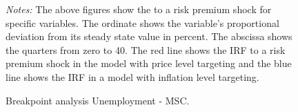 \documentclass[11pt, a4paper, leqno]{article}
\begin{document}
\begin{figure}[ht!]
	\caption{Breakpoint analysis Unemployment - MSC.}
	\label{fig:irf}
	\centering
    	\bigskip
	\begin{minipage}{\textwidth}%
		\footnotesize\setlength{\baselineskip}{11pt}%
		\bigskip \textit{Notes:} The above figures show the  to a risk premium shock for specific variables. The ordinate shows the variable's proportional deviation from its steady state value in percent. The abscissa shows the quarters from zero to 40. The red line shows the IRF to a risk premium shock in the model with price level targeting and the blue line shows the IRF in a model with inflation level targeting.
	\end{minipage}
\end{figure}
\end{document}
